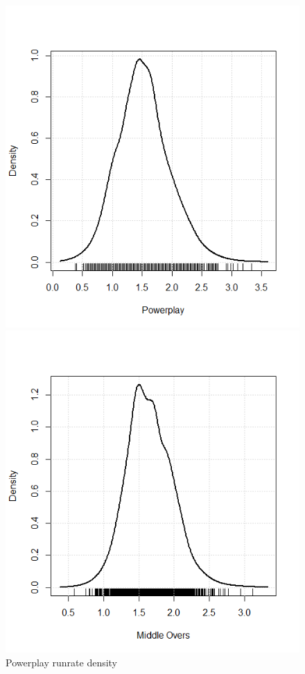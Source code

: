 \begin{figure}[h]
      \includegraphics[width=\linewidth]{figures/powerplaydens.png}
      \caption{Powerplay runrate density}
    \endminipage\hfill
      \includegraphics[width=\linewidth]{figures/middleoversdens.png}

\end{figure}

